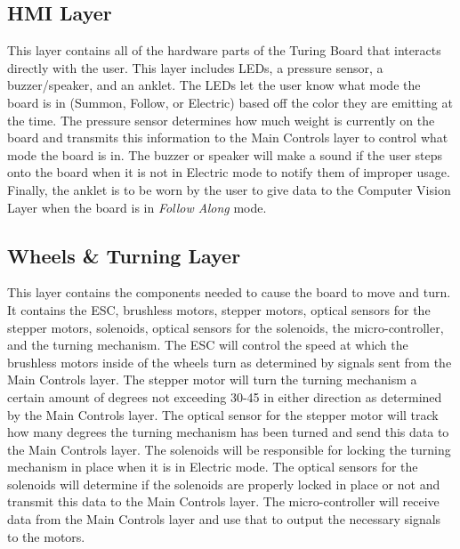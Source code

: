 \subsection{HMI Layer}
This layer contains all of the hardware parts of the Turing Board that interacts directly with the user. This layer includes LEDs, a pressure sensor, a buzzer/speaker, and an anklet. The LEDs let the user know what mode the board is in (Summon, Follow, or Electric) based off the color they are emitting at the time. The pressure sensor determines how much weight is currently on the board and transmits this information to the Main Controls layer to control what mode the board is in. The buzzer or speaker will make a sound if the user steps onto the board when it is not in Electric mode to notify them of improper usage. Finally, the anklet is to be worn by the user to give data to the Computer Vision Layer when the board is in {\it Follow Along} mode.

\subsection{Wheels \& Turning Layer}
This layer contains the components needed to cause the board to move and turn. It contains the ESC, brushless motors, stepper motors, optical sensors for the stepper motors, solenoids, optical sensors for the solenoids, the micro-controller, and the turning mechanism. The ESC will control the speed at which the brushless motors inside of the wheels turn as determined by signals sent from the Main Controls layer. The stepper motor will turn the turning mechanism a certain amount of degrees not exceeding 30-45 in either direction as determined by the Main Controls layer. The optical sensor for the stepper motor will track how many degrees the turning mechanism has been turned and send this data to the Main Controls layer. The solenoids will be responsible for locking the turning mechanism in place when it is in Electric mode. The optical sensors for the solenoids will determine if the solenoids are properly locked in place or not and transmit this data to the Main Controls layer. The micro-controller will receive data from the Main Controls layer and use that to output the necessary signals to the motors. 

